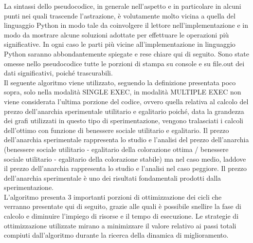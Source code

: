 \newpage
La sintassi dello pseudocodice, in generale nell'aspetto e in particolare in alcuni punti nei quali trascende l'astrazione, è volutamente molto vicina a quella del linguaggio Python in modo tale da coinvolgere il lettore nell'implementazione e in modo da mostrare alcune soluzioni adottate per effettuare le operazioni più significative. In ogni caso le parti più vicine all'implementazione in linguaggio Python saranno abbondantemente spiegate e rese chiare qui di seguito. Sono state omesse nello pseudocodice tutte le porzioni di stampa su console e su file.out dei dati significativi, poiché trascurabili.\\
Il seguente algoritmo viene utilizzato, seguendo la definizione presentata poco sopra, solo nella modalità SINGLE EXEC, in modalità MULTIPLE EXEC non viene considerata l'ultima porzione del codice, ovvero quella relativa al calcolo del prezzo dell'anarchia sperimentale utilitario e egalitario poiché, data la grandezza dei grafi utilizzati in questo tipo di sperimentazione, vengono tralasciati i calcoli dell'ottimo con funzione di benessere sociale utilitario e egalitario. Il prezzo dell'anarchia sperimentale rappresenta lo studio e l'analisi del prezzo dell'anarchia (benessere sociale utilitario - egalitario della colorazione ottima / benessere sociale utilitario - egalitario della colorazione stabile) ma nel caso medio, laddove il prezzo dell'anarchia rappresenta lo studio e l'analisi nel caso peggiore. Il prezzo dell'anarchia sperimentale è uno dei risultati fondamentali prodotti dalla sperimentazione.\\
L'algoritmo presenta 3 importanti porzioni di ottimizzazione dei cicli che verranno presentate qui di seguito, grazie alle quali è possibile snellire la fase di calcolo e diminuire l'impiego di risorse e il tempo di esecuzione. Le strategie di ottimizzazione utilizzate mirano a minimizzare il valore relativo ai passi totali compiuti dall'algoritmo durante la ricerca della dinamica di miglioramento.\\
